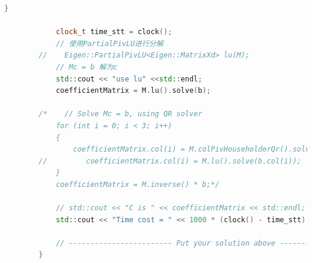 \documentclass[40pt,a4paper,UTF8,twocolumn]{ctexart}%
\numberwithin{equation}{section}
\begin{document}
\begin{lstlisting}[language=C++, caption=click\_gen.cpp/minimumJerkTrajGen()]
            }
        
            clock_t time_stt = clock();
            // 使用PartialPivLU进行分解
        //    Eigen::PartialPivLU<Eigen::MatrixXd> lu(M);
            // Mc = b 解为c
            std::cout << "use lu" <<std::endl;
            coefficientMatrix = M.lu().solve(b);
        
        /*    // Solve Mc = b, using QR solver
            for (int i = 0; i < 3; i++)
            {
                coefficientMatrix.col(i) = M.colPivHouseholderQr().solve(b.col(i));
        //         coefficientMatrix.col(i) = M.lu().solve(b.col(i));
            }
            coefficientMatrix = M.inverse() * b;*/
        
            // std::cout << "C is " << coefficientMatrix << std::endl;
            std::cout << "Time cost = " << 1000 * (clock() - time_stt) / (double)CLOCKS_PER_SEC << "ms" << std::endl;
        
            // ------------------------ Put your solution above ------------------------
        }
\end{lstlisting}
\end{document}
